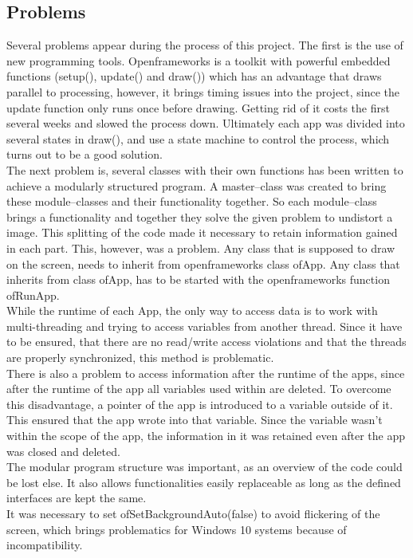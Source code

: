 \documentclass[journal,final,a4paper,twoside]{PS}
\begin{document}
\subsection{Problems}
\label{sec:probs}
Several problems appear during the process of this project.
The first is the use of new programming tools. Openframeworks is a toolkit with powerful embedded functions (setup(), update() and draw()) which has an advantage that draws parallel to processing, however, it brings timing issues into the project, since the update function only runs once before drawing. Getting rid of it costs the first several weeks and slowed the process down. Ultimately each app was divided into several states in draw(), and use a state machine to control the process, which turns out to be a good solution.  \\
The next problem is, several classes with their own functions has been written to achieve a modularly structured program. A  master--class was created to bring these module--classes and their functionality together. So each module--class brings a functionality and together they solve the given problem to undistort a image. This splitting of the code made it necessary to retain information gained in each part. This, however, was a problem. Any class that is supposed to draw on the screen, needs to inherit from openframeworks class ofApp. Any class that inherits from class ofApp, has to be started with the openframeworks function ofRunApp.\\
While the runtime of each App, the only way to access data is to work with multi-threading and trying to access variables from another thread. Since it have to be ensured, that there are no read/write access violations and that the threads are properly synchronized, this method is problematic. \\
There is also a problem to access information after the runtime of the apps, since after the runtime of the app all variables used within are deleted. To overcome this disadvantage, a pointer of the app is introduced to a variable outside of it. This ensured that the app wrote into that variable. Since the variable wasn't within the scope of the app, the information in it was retained even after the app was closed and deleted.\\
The modular program structure was important, as an overview of the code could be lost else. It also allows functionalities easily replaceable as long as the defined interfaces are kept the same.
\\
It was necessary to set ofSetBackgroundAuto(false) to avoid flickering of the screen, which brings problematics for Windows 10 systems because of incompatibility. 
\end{document}
